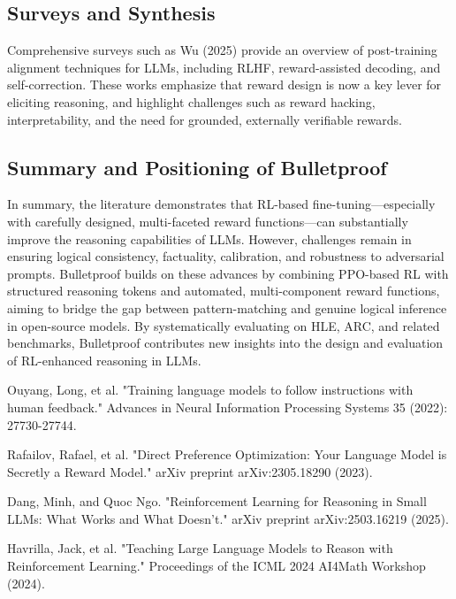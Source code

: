 \subsection{Surveys and Synthesis}

Comprehensive surveys such as Wu (2025) \citep{wu2025} provide an overview of post-training alignment techniques for LLMs, including RLHF, reward-assisted decoding, and self-correction. These works emphasize that reward design is now a key lever for eliciting reasoning, and highlight challenges such as reward hacking, interpretability, and the need for grounded, externally verifiable rewards.

\subsection{Summary and Positioning of Bulletproof}

In summary, the literature demonstrates that RL-based fine-tuning—especially with carefully designed, multi-faceted reward functions—can substantially improve the reasoning capabilities of LLMs. However, challenges remain in ensuring logical consistency, factuality, calibration, and robustness to adversarial prompts. Bulletproof builds on these advances by combining PPO-based RL with structured reasoning tokens and automated, multi-component reward functions, aiming to bridge the gap between pattern-matching and genuine logical inference in open-source models. By systematically evaluating on HLE, ARC, and related benchmarks, Bulletproof contributes new insights into the design and evaluation of RL-enhanced reasoning in LLMs.


Ouyang, Long, et al. "Training language models to follow instructions with human feedback." Advances in Neural Information Processing Systems 35 (2022): 27730-27744. 

Rafailov, Rafael, et al. "Direct Preference Optimization: Your Language Model is Secretly a Reward Model." arXiv preprint arXiv:2305.18290 (2023).

Dang, Minh, and Quoc Ngo. "Reinforcement Learning for Reasoning in Small LLMs: What Works and What Doesn't." arXiv preprint arXiv:2503.16219 (2025).

Havrilla, Jack, et al. "Teaching Large Language Models to Reason with Reinforcement Learning." Proceedings of the ICML 2024 AI4Math Workshop (2024).

